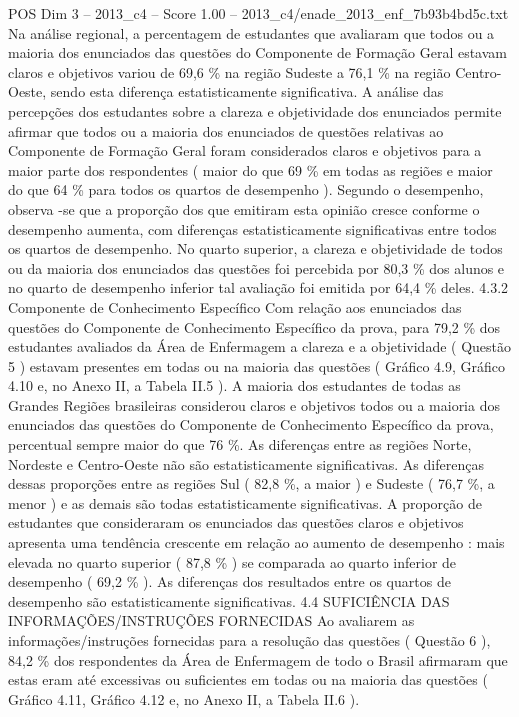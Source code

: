 \begin{textsample}{POS Dim 3 – 2013\_c4 – Score 1.00 – 2013\_c4/enade\_2013\_enf\_7b93b4bd5c.txt}
Na análise regional, a percentagem de estudantes que avaliaram que todos ou a maioria dos enunciados das questões do Componente de Formação Geral estavam claros e objetivos variou de 69,6 \% na região Sudeste a 76,1 \% na região Centro-Oeste, sendo esta diferença estatisticamente significativa.
A análise das percepções dos estudantes sobre a clareza e objetividade dos enunciados permite afirmar que todos ou a maioria dos enunciados de questões relativas ao Componente de Formação Geral foram considerados claros e objetivos para a maior parte dos respondentes ( maior do que 69 \% em todas as regiões e maior do que 64 \% para todos os quartos de desempenho ).
Segundo o desempenho, observa -se que a proporção dos que emitiram esta opinião cresce conforme o desempenho aumenta, com diferenças estatisticamente significativas entre todos os quartos de desempenho.
No quarto superior, a clareza e objetividade de todos ou da maioria dos enunciados das questões foi percebida por 80,3 \% dos alunos e no quarto de desempenho inferior tal avaliação foi emitida por 64,4 \% deles. 4.3.2 Componente de Conhecimento Específico Com relação aos enunciados das questões do Componente de Conhecimento Específico da prova, para 79,2 \% dos estudantes avaliados da Área de Enfermagem a clareza e a objetividade ( Questão 5 ) estavam presentes em todas ou na maioria das questões ( Gráfico 4.9, Gráfico 4.10 e, no Anexo II, a Tabela II.5 ).
A maioria dos estudantes de todas as Grandes Regiões brasileiras considerou claros e objetivos todos ou a maioria dos enunciados das questões do Componente de Conhecimento Específico da prova, percentual sempre maior do que 76 \%.
As diferenças entre as regiões Norte, Nordeste e Centro-Oeste não são estatisticamente significativas.
As diferenças dessas proporções entre as regiões Sul ( 82,8 \%, a maior ) e Sudeste ( 76,7 \%, a menor ) e as demais são todas estatisticamente significativas.
A proporção de estudantes que consideraram os enunciados das questões claros e objetivos apresenta uma tendência crescente em relação ao aumento de desempenho : mais elevada no quarto superior ( 87,8 \% ) se comparada ao quarto inferior de desempenho ( 69,2 \% ).
As diferenças dos resultados entre os quartos de desempenho são estatisticamente significativas. 4.4 SUFICIÊNCIA DAS INFORMAÇÕES/INSTRUÇÕES FORNECIDAS Ao avaliarem as informações/instruções fornecidas para a resolução das questões ( Questão 6 ), 84,2 \% dos respondentes da Área de Enfermagem de todo o Brasil afirmaram que estas eram até excessivas ou suficientes em todas ou na maioria das questões ( Gráfico 4.11, Gráfico 4.12 e, no Anexo II, a Tabela II.6 ).

\end{textsample}
